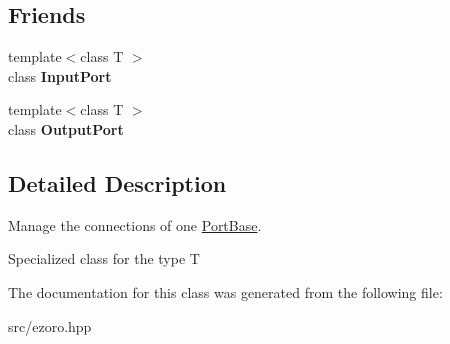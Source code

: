 \subsection*{Friends}
\begin{DoxyCompactItemize}
\item 
\hypertarget{classcoco_1_1_connection_manager_aa750daec74c1bf813c092ea268f3b8f8}{{\footnotesize template$<$class T $>$ }\\class {\bfseries Input\-Port}}\label{classcoco_1_1_connection_manager_aa750daec74c1bf813c092ea268f3b8f8}

\item 
\hypertarget{classcoco_1_1_connection_manager_a1b667fb33da7060c4747eeafcd85db20}{{\footnotesize template$<$class T $>$ }\\class {\bfseries Output\-Port}}\label{classcoco_1_1_connection_manager_a1b667fb33da7060c4747eeafcd85db20}

\end{DoxyCompactItemize}


\subsection{Detailed Description}
Manage the connections of one \hyperlink{classcoco_1_1_port_base}{Port\-Base}. 

Specialized class for the type T 

The documentation for this class was generated from the following file\-:\begin{DoxyCompactItemize}
\item 
src/ezoro.\-hpp\end{DoxyCompactItemize}
